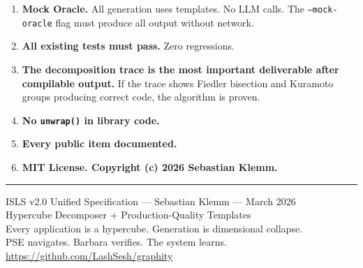 \documentclass[11pt,a4paper]{article}
\begin{document}
\begin{enumerate}
\item \textbf{Mock Oracle.} All generation uses templates. No LLM calls.
  The \texttt{--mock-oracle} flag must produce all output without network.

\item \textbf{All existing tests must pass.} Zero regressions.

\item \textbf{The decomposition trace is the most important deliverable
  after compilable output.} If the trace shows Fiedler bisection and
  Kuramoto groups producing correct code, the algorithm is proven.

\item \textbf{No \texttt{unwrap()} in library code.}
\item \textbf{Every public item documented.}
\item \textbf{MIT License. Copyright (c) 2026 Sebastian Klemm.}
\end{enumerate}

\vfill
\noindent\rule{\textwidth}{0.4pt}
\begin{center}
\small
ISLS v2.0 Unified Specification --- Sebastian Klemm --- March 2026\\
Hypercube Decomposer + Production-Quality Templates\\
Every application is a hypercube. Generation is dimensional collapse.\\
PSE navigates. Barbara verifies. The system learns.\\
\url{https://github.com/LashSesh/graphity}
\end{center}
\end{document}
